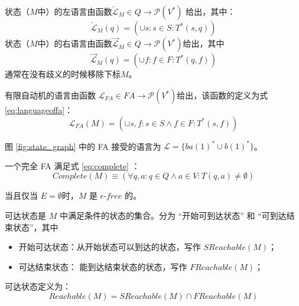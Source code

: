 \begin{definition}
    状态（$M$中）的左语言由函数$ \overleftarrow{\mathcal{L}} _M \in Q \longrightarrow \mathcal{P}(V^*)$ 给出，其中：
    \[ 
        \overleftarrow{\mathcal{L}}_M (q) = ( \cup s:s \in S : T^*(s,q) )  
    \] 
    状态（$M$中）的右语言由函数$ \overrightarrow{\mathcal{L}} _M \in Q \longrightarrow \mathcal{P}(V^*)$给出，其中 
    \[ 
        \overrightarrow{\mathcal{L}}_M (q) = ( \cup f:f \in F : T^*(q,f) ) 
    \] 
    通常在没有歧义的时候移除下标$M$。
\end{definition}

\begin{definition}
    有限自动机的语言由函数 $\mathcal{L}_{FA} \in FA \longrightarrow \mathcal{P}(V^*) $给出，该函数的定义为式 \ref{eq:languageoffa}： 
    \begin{equation}\label{eq:languageoffa}
        \mathcal{L}_{FA} (M) = (\cup s,f:s \in S \land f \in F : T^* (s,f))
    \end{equation}
\end{definition}

\begin{example}[FA 的语言]
    图 \ref{fig:state_graph} 中的 FA 接受的语言为 $ \mathcal{L}= \{ ba(1)^*\cup b(1)^* \}$。
\end{example}

\begin{definition}[完全 FA ($Complete$)]
    一个完全 FA 满足式 \ref{eq:complete} ：
    \begin{equation} \label{eq:complete}
        Complete(M) \equiv ( \forall q,a:q\in Q \land a \in V : T(q,a) \not= \emptyset ) 
    \end{equation}
\end{definition}

\begin{definition}
    当且仅当 $E=\emptyset$时，$M$ 是 $\epsilon$-$free$ 的。
\end{definition}

\begin{definition}
    可达状态是 $M$ 中满足条件的状态的集合。分为 “开始可到达状态” 和 “可到达结束状态”，其中
    \begin{itemize}
        \item 开始可达状态：从开始状态可以到达的状态，写作 $SReachable(M)$；
        \item 可达结束状态： 能到达结束状态的状态，写作 $FReachable(M)$；
    \end{itemize}
    可达状态定义为：
    \[ Reachable(M) = SReachable(M) \cap FReachable(M) \]
\end{definition}

